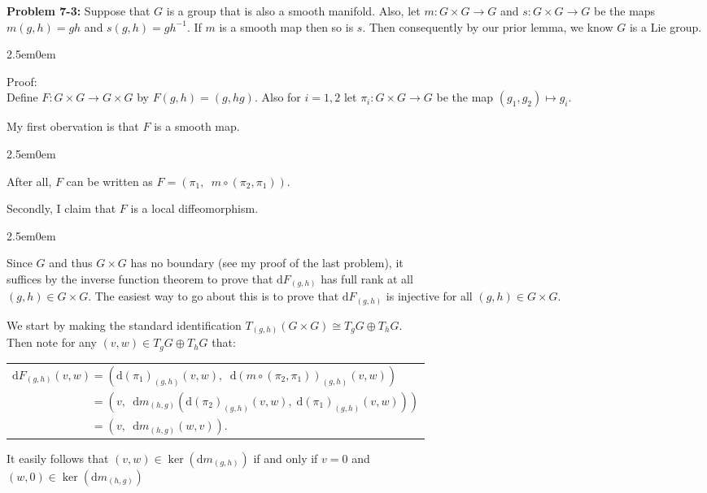 \documentclass{book}
\newcommand{\Hstatement}{%
   \color{MidnightBlue!90!Black}%
   \fontsize{12}{13}\selectfont%
}
\newcommand{\HexOne}{%
   \color{Purple}%
   \fontsize{12}{13}\selectfont%
}
\newcommand{\HexTwoP}{%
   \color{RedViolet}%
   \fontsize{12}{13}\selectfont%
}
\newenvironment{myIndent}{%
   \begin{adjustwidth}{2.5em}{0em}%
}{%
   \end{adjustwidth}%
}
\newcommand{\blab}[1]{\textbf{#1}}
\newcommand{\df}{\mathrm{d}}
\newcommand{\retTwo}{\hfill\bigbreak}
\begin{document}
\Hstatement\blab{Problem 7-3:} Suppose that $G$ is a group that is also a smooth manifold. Also, let $m: G \times G \to G$ and $s: G \times G \to G$ be the maps $m(g, h) = gh$ and $s(g, h) = gh^{-1}$. If $m$ is a smooth map then so is $s$. Then consequently by our prior lemma, we know $G$ is a Lie group. 
\begin{myIndent}\HexOne
	Proof:\\
	Define $F: G \times G \to G \times G$ by $F(g, h) = (g, hg)$. Also for $i = 1, 2$ let $\pi_i: G \times G \to G$ be the map $(g_1, g_2) \mapsto g_i$.\retTwo
	
	My first obervation is that $F$ is a smooth map.
	\begin{myIndent}\HexTwoP
		After all, $F$ can be written as $F = (\pi_1,\phantom{a} m \circ (\pi_2, \pi_1))$.\retTwo
	\end{myIndent}

	Secondly, I claim that $F$ is a local diffeomorphism.
	\begin{myIndent}\HexTwoP
		Since $G$ and thus $G \times G$ has no boundary (see my proof of the last problem), it\\ suffices by the inverse function theorem to prove that $\df F_(g, h)$ has full rank at all\\ $(g, h) \in G \times G$. The easiest way to go about this is to prove that $\df F_{(g, h)}$ is injective for all $(g, h) \in G \times G$.\retTwo
		
		We start by making the standard identification $T_{(g, h)}(G \times G) \cong T_g G \oplus T_h G$.\\ Then note for any $(v, w) \in T_g G \oplus T_h G$ that:

		{\centering\begin{tabular}{l}
			$\df F_{(g, h)}(v, w) = (\df (\pi_1)_{(g, h)}(v, w), \phantom{a} \df (m \circ (\pi_2, \pi_1))_{(g, h)}(v, w))$\\ [4pt]
			$\phantom{\df F_{(g, h)}(v, w)} = \left(v, \phantom{a} \df m_{(h, g)}\left(\df (\pi_2)_{(g, h)}(v, w),\phantom{.} \df (\pi_1)_{(g, h)}(v, w)\right)\right)$\\ [4pt]
			$\phantom{\df F_{(g, h)}(v, w)} = \left(v, \phantom{a} \df m_{(h, g)}\left(w, v\right)\right)$.
		\end{tabular}\retTwo\par}

		It easily follows that $(v, w) \in \ker(\df m_{(g, h)})$ if and only if $v = 0$ and\\ $(w, 0) \in \ker(\df m_{(h, g)})$\retTwo


\end{myIndent}
\end{myIndent}
\end{document}
